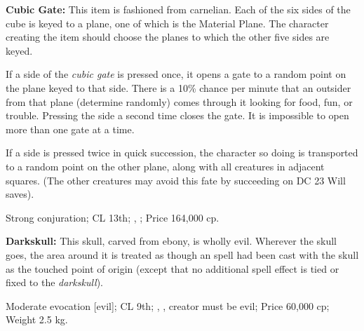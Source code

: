 \textbf{Cubic Gate:} This item is fashioned from carnelian. Each of the six sides of the cube is keyed to a plane, one of which is the Material Plane. The character creating the item should choose the planes to which the other five sides are keyed.

If a side of the \emph{cubic gate} is pressed once, it opens a gate to a random point on the plane keyed to that side. There is a 10\% chance per minute that an outsider from that plane (determine randomly) comes through it looking for food, fun, or trouble. Pressing the side a second time closes the gate. It is impossible to open more than one gate at a time.

If a side is pressed twice in quick succession, the character so doing is transported to a random point on the other plane, along with all creatures in adjacent squares. (The other creatures may avoid this fate by succeeding on DC 23 Will saves).

Strong conjuration; CL 13th; , ; Price 164,000 cp.



\textbf{Darkskull:} This skull, carved from ebony, is wholly evil. Wherever the skull goes, the area around it is treated as though an  spell had been cast with the skull as the touched point of origin (except that no additional spell effect is tied or fixed to the \emph{darkskull}).

Moderate evocation [evil]; CL 9th; , , creator must be evil; Price 60,000 cp; Weight 2.5 kg.






